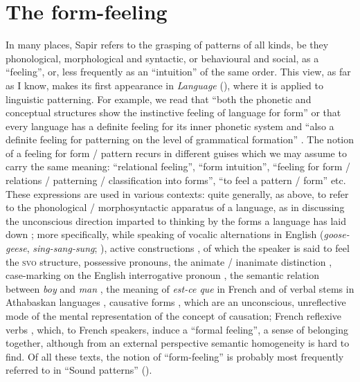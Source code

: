 \documentclass[output=paper]{langscibook}
\begin{document}
\section{The form-feeling}
\label{sec:fortis:form-feeling}

In many places, Sapir refers to the grasping of patterns of all kinds, be they phonological, morphological and syntactic, or behavioural and social, as a ``feeling'', or, less frequently as an ``intuition'' of the same order. This view, as far as I know, makes its first appearance in \emph{Language} (\citeyear{Sapir1921}), where it is applied to linguistic patterning. For example, we read that ``both the phonetic and conceptual structures show the instinctive feeling of language for form'' \citep[56]{Sapir1921} or that every language has a definite feeling for its inner phonetic system and ``also a definite feeling for patterning on the level of grammatical formation'' \citep[61]{Sapir1921}. The notion of a feeling for form / pattern recurs in different guises which we may assume to carry the same meaning: ``relational feeling'', ``form intuition'', ``feeling for form / relations / patterning / classification into forms'', ``to feel a pattern / form'' etc. These expressions are used in various contexts: quite generally, as above, to refer to the phonological / morphosyntactic apparatus of a language, as in discussing the unconscious direction imparted to thinking by the forms a language has laid down \citep[153]{Sapir1924}; more specifically, while speaking of vocalic alternations in English (\emph{goose-geese}, \emph{sing-sang-sung}; \citealt[60--61]{Sapir1921}), active constructions \citep[84-85, 111]{Sapir1921}, of which the speaker is said to feel the \textsc{svo} structure, possessive pronouns, the animate / inanimate distinction \citep[156]{Sapir1921}, case-marking on the English interrogative pronoun \citep[159]{Sapir1921}, the semantic relation between \emph{boy} and \emph{man} \citep[61]{Sapir1929b}, the meaning of \emph{est-ce que} in French and of verbal stems in Athabaskan languages \citep[147]{Sapir1923}, causative forms \citep[154]{Sapir1924}, which are an unconscious, unreflective mode of the mental representation of the concept of causation;  French reflexive verbs \citep[116]{Sapir1931}, which, to French speakers, induce a ``formal feeling'', a sense of belonging together, although from an external perspective semantic homogeneity is hard to find. Of all these texts, the notion of ``form-feeling'' is probably most frequently referred to in ``Sound patterns'' (\citeyear{Sapir1925}).
\end{document}
